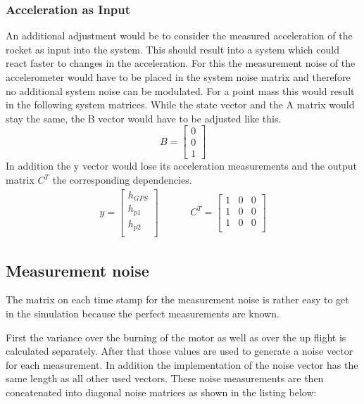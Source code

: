 \subsubsection{Acceleration as Input}
An additional adjustment would be to consider the measured acceleration of the rocket as input into the system.
This should result into a system which could react faster to changes in the acceleration.
For this the measurement noise of the accelerometer would have to be placed in the system noise matrix
and therefore no additional system noise can be modulated.
For a point mass this would result in the following system matrices.
While the state vector and the A matrix would stay the same, the B vector would have to be adjusted like this.
$$ B = \begin{bmatrix}
        0 \\
        0 \\
        1
       \end{bmatrix}
$$
In addition the y vector would lose its acceleration measurements and the output matrix $C^T$ the corresponding dependencies.
\begin{align*}
 y = \begin{bmatrix}
      h_{GPS} \\
      h_{p1} \\
      h_{p2} \\
     \end{bmatrix}
      & \hspace{1cm}
 C^T = \begin{bmatrix}
        1 & 0 & 0 \\
        1 & 0 & 0 \\
        1 & 0 & 0 \\
       \end{bmatrix}
\end{align*}

\subsection{Measurement noise}
The matrix on each time stamp for the measurement noise is rather easy to get in the simulation because the perfect measurements are known.

First the variance over the burning of the motor as well as over the up flight is calculated separately.
After that those values are used to generate a noise vector for each measurement.
In addition the implementation of the noise vector has the same length as all other used vectors.
These noise measurements are then concatenated into diagonal noise matrices as shown in the listing below:

